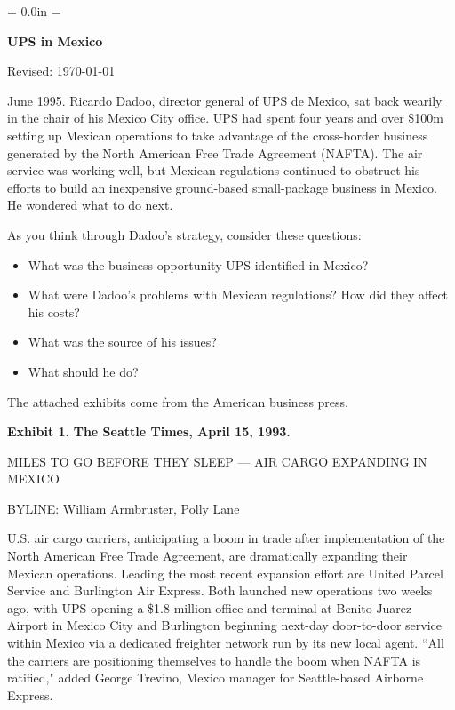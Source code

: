 \documentclass[letterpaper,12pt]{article}
\def\HeadName{UPS in Mexico}
\begin{document}
\parindent = 0.0in
\parskip = \bigskipamount
\thispagestyle{empty}%
\Head

\centerline{\large \bf \HeadName}%
\centerline{Revised:  \today}

\bigskip
June 1995.  Ricardo Dadoo, director general of UPS de Mexico, sat
back wearily in the chair of his Mexico City office.  UPS had spent
four years and over \$100m setting up Mexican operations to take
advantage of the cross-border business generated by the 
North American Free Trade Agreement (NAFTA).  The air
service was working well, but Mexican regulations continued to
obstruct his efforts to build an inexpensive ground-based
small-package business in Mexico. 
He wondered what to do next.

As you think through Dadoo's strategy, consider these questions:
%
\begin{itemize}
\item What was the business opportunity UPS identified in Mexico?  

\item What were Dadoo's problems with Mexican regulations? 
How did they affect his costs?  

\item What was the source of his issues?  

\item What should he do?
\end{itemize}

The attached exhibits come from the American business press.



\pagebreak%
{\bf Exhibit 1.} {\bf The Seattle Times, April 15, 1993.}

MILES TO GO BEFORE THEY SLEEP --- AIR CARGO EXPANDING IN MEXICO

BYLINE: William Armbruster, Polly Lane

U.S. air cargo carriers, anticipating a boom in trade after
implementation of the North American Free Trade Agreement, are
dramatically expanding their Mexican operations. Leading the most
recent expansion effort are United Parcel Service and Burlington Air
Express. Both launched new operations two weeks ago, with UPS
opening a \$1.8 million office and terminal at Benito Juarez Airport
in Mexico City and Burlington beginning next-day door-to-door
service within Mexico via a dedicated freighter network run by its
new local agent. ``All the carriers are positioning themselves to
handle the boom when NAFTA is ratified," added George Trevino,
Mexico manager for Seattle-based Airborne Express.
\end{document}
